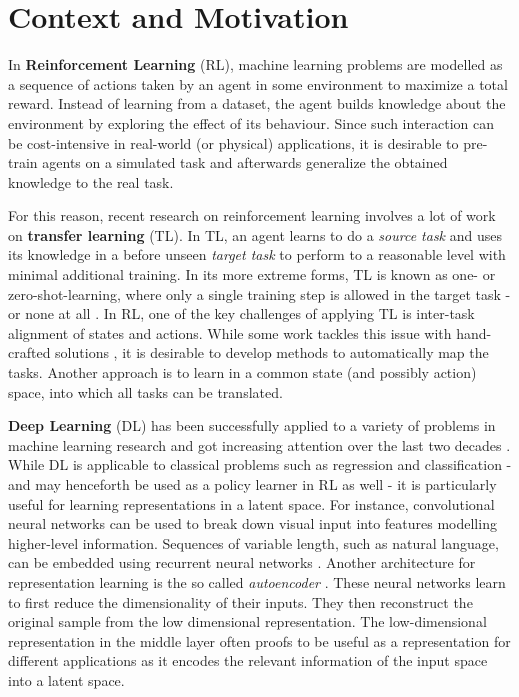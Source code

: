 \section{Context and Motivation}
\label{sec:context}

In \textbf{Reinforcement Learning} (RL), machine learning problems are modelled as a sequence of actions taken by an agent in some environment to maximize a total reward. Instead of learning from a dataset, the agent builds knowledge about the environment by exploring the effect of its behaviour. Since such interaction can be cost-intensive in real-world (or physical) applications, it is desirable to pre-train agents on a simulated task and afterwards generalize the obtained knowledge to the real task. 

For this reason, recent research on reinforcement learning involves a lot of work on \textbf{transfer learning} (TL). In TL, an agent learns to do a \textit{source task} and uses its knowledge in a before unseen \textit{target task} to perform to a reasonable level with minimal additional training. In its more extreme forms, TL is known as one- or zero-shot-learning, where only a single training step is allowed in the target task - or none at all \citep{goodfellow2016deep}. In RL, one of the key challenges of applying TL is inter-task alignment of states and actions. While some work tackles this issue with hand-crafted solutions \citep[e.g.][]{taylor2007cross}, it is desirable to develop methods to automatically map the tasks. Another approach is to learn in a common state (and possibly action) space, into which all tasks can be translated.

\textbf{Deep Learning} (DL) has been successfully applied to a variety of problems in machine learning research and got increasing attention over the last two decades \citep{goodfellow2016deep}. While DL is applicable to classical problems such as regression and classification - and may henceforth be used as a policy learner in RL as well - it is particularly useful for learning representations in a latent space. For instance, convolutional neural networks can be used to break down visual input into features modelling higher-level information. Sequences of variable length, such as natural language, can be embedded using recurrent neural networks \citep{goldberg2017neural}. Another architecture for representation learning is the so called \textit{autoencoder} \citep{hinton2006reducing}. These neural networks learn to first reduce the dimensionality of their inputs. They then reconstruct the original sample from the low dimensional representation. The low-dimensional representation in the middle layer often proofs to be useful as a representation for different applications as it encodes the relevant information of the input space into a latent space. 

